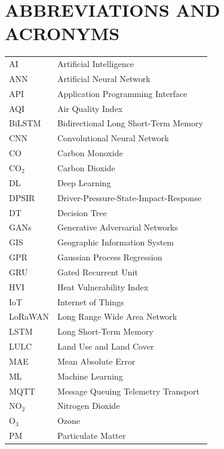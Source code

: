 \chapter*{ABBREVIATIONS AND ACRONYMS}

\begin{tabular}{@{}ll}
AI        & Artificial Intelligence \\
ANN       & Artificial Neural Network \\
API       & Application Programming Interface \\
AQI       & Air Quality Index \\
BiLSTM    & Bidirectional Long Short-Term Memory \\
CNN       & Convolutional Neural Network \\
CO        & Carbon Monoxide \\
CO$_2$   & Carbon Dioxide \\
DL        & Deep Learning \\
DPSIR     & Driver-Pressure-State-Impact-Response \\
DT        & Decision Tree \\
GANs      & Generative Adversarial Networks \\
GIS       & Geographic Information System \\
GPR       & Gaussian Process Regression \\
GRU       & Gated Recurrent Unit \\
HVI       & Heat Vulnerability Index \\
IoT       & Internet of Things \\
LoRaWAN   & Long Range Wide Area Network \\
LSTM      & Long Short-Term Memory \\
LULC      & Land Use and Land Cover \\
MAE       & Mean Absolute Error \\
ML        & Machine Learning \\
MQTT      & Message Queuing Telemetry Transport \\
NO$_2$   & Nitrogen Dioxide \\
O$_3$    & Ozone \\
PM        & Particulate Matter \\

\end{tabular}
